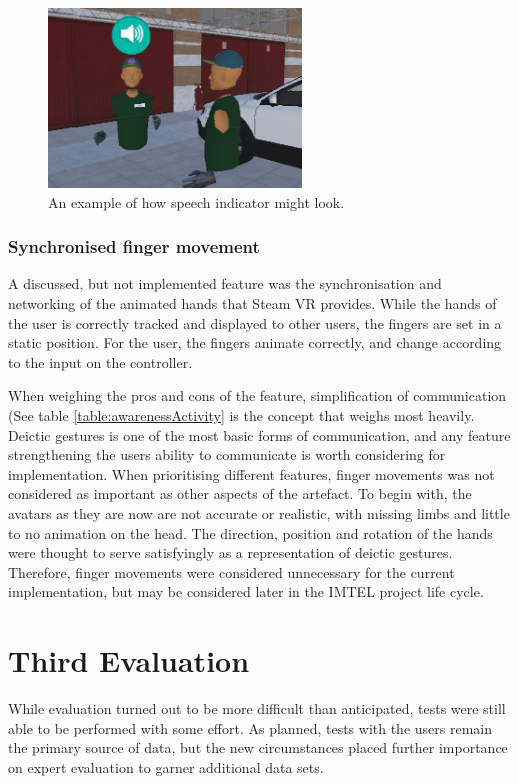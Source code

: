 \begin{figure}[H]
  \centering
   \captionsetup{width=.6\linewidth}
    \includegraphics[width=0.6\textwidth]{fig/phase_3/implementation/speechIndicator.PNG}
 \caption{An example of how speech indicator might look.}
\label{fig:phase3_speech}
\end{figure}


\subsubsection{Synchronised finger movement}
A discussed, but not implemented feature was the synchronisation and networking of the animated hands that Steam VR provides. While the hands of the user is correctly tracked and displayed to other users, the fingers are set in a static position. For the user, the fingers animate correctly, and change according to the input on the controller.

When weighing the pros and cons of the feature, simplification of communication (See table \ref{table:awarenessActivity} is the concept that weighs most heavily. Deictic gestures is one of the most basic forms of communication, and any feature strengthening the users ability to communicate is worth considering for implementation. When prioritising different features, finger movements was not considered as important as other aspects of the artefact. To begin with, the avatars as they are now are not accurate or realistic, with missing limbs and little to no animation on the head. The direction, position and rotation of the hands were thought to serve satisfyingly as a representation of deictic gestures. Therefore, finger movements were considered unnecessary for the current implementation, but may be considered later in the IMTEL project life cycle.



\section{Third Evaluation}
\label{section:evalPhase3}
While evaluation turned out to be more difficult than anticipated, tests were still able to be performed with some effort. As planned, tests with the  users remain the primary source of data, but the new circumstances placed further importance on expert evaluation to garner additional data sets.

